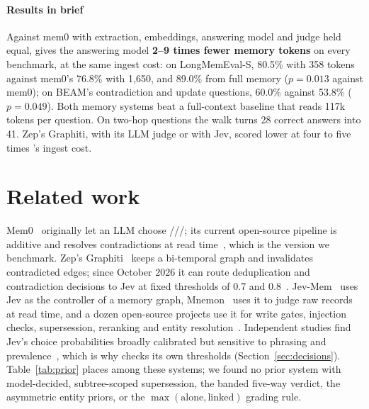 \paragraph{Results in brief} Against mem0 with extraction, embeddings, answering model and judge held equal, \mx{}
gives the answering model \textbf{2--9 times fewer memory tokens} on every benchmark, at the same ingest cost: on
LongMemEval-S, 80.5\% with 358 tokens against mem0's 76.8\% with 1,650, and 89.0\% from full memory ($p=0.013$ against
mem0); on BEAM's contradiction and update questions, 60.0\% against 53.8\% ($p=0.049$). Both memory systems beat a
full-context baseline that reads 117k tokens per question. On two-hop questions the walk turns 28 correct answers into
41. Zep's Graphiti, with its LLM judge or with Jev, scored lower at four to five times \mx{}'s ingest cost.

\section{Related work}\label{sec:related}

Mem0~\cite{mem0} originally let an LLM choose ///; its current
open-source pipeline is additive and resolves contradictions at read time~\cite{mem0v3}, which is the version we
benchmark. Zep's Graphiti~\cite{zep} keeps a bi-temporal graph and invalidates contradicted edges; since October 2026 it
can route deduplication and contradiction decisions to Jev at fixed thresholds of 0.7 and 0.8~\cite{graphitijev}.
Jev-Mem~\cite{jevmem} uses Jev as the controller of a memory graph, Mnemon~\cite{mnemon} uses it to judge raw records at
read time, and a dozen open-source projects use it for write gates, injection checks, supersession, reranking and entity
resolution~\cite{jevmemoss,invalidate,dshmem,hindsightjev,supermemoryjev,slashid}. Independent studies find Jev's
choice probabilities broadly calibrated but sensitive to phrasing and prevalence~\cite{deusser,jevsurvey,meng}, which
is why \mx{} checks its own thresholds (Section~\ref{sec:decisions}). Table~\ref{tab:prior} places \mx{} among these
systems; we found no prior system with model-decided, subtree-scoped supersession, the banded five-way verdict, the
asymmetric entity priors, or the $\max(\text{alone},\text{linked})$ grading rule.

